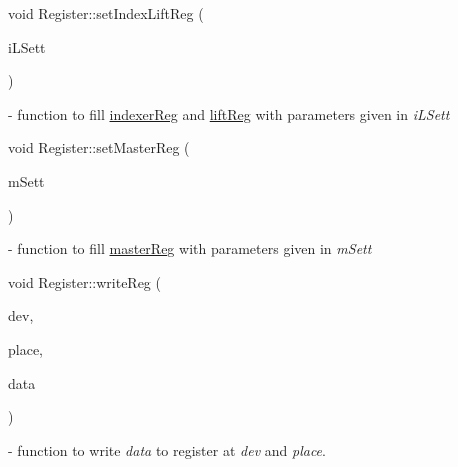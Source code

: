 {\mbox{\label{classRegister_a7c0d35bc6f9c7d944c178a0b6855072e}} 
{\footnotesize\ttfamily void Register\+::\texorpdfstring{set\+Index\+Lift\+Reg}{setIndexLiftReg} (\begin{DoxyParamCaption}\item[{\mbox{\hyperlink{classIndexerLiftSettings}{Indexer\+Lift\+Settings}}}]{i\+L\+Sett }\end{DoxyParamCaption})} - function to fill \hyperlink{classRegister_ae56b5e4f7096735ffadf834c1ba32dff}{indexer\+Reg} and \hyperlink{classRegister_a5287cbe2ef32fdb9cdbcd6e4bdd82647}{lift\+Reg} with parameters given in \textit{i\+L\+Sett}

\mbox{\label{classRegister_a992283907794ce91287b3c4357385aa4}} 
{\footnotesize\ttfamily void Register\+::\texorpdfstring{set\+Master\+Reg}{setMasterReg} (\begin{DoxyParamCaption}\item[{\mbox{\hyperlink{classMachineSettings}{Machine\+Settings}}}]{m\+Sett }\end{DoxyParamCaption})} - function to fill \hyperlink{classRegister_ae778c3bcd7170fe6648df3979082e9f8}{master\+Reg} with parameters given in \mbox{\textit{m\+Sett}}

\mbox{\label{classRegister_a6c51e7d73be200ba0c9b72b1407b6fe2}} 
{\footnotesize\ttfamily void Register\+::\texorpdfstring{write\+Reg}{writeReg} (\begin{DoxyParamCaption}\item[{\mbox{\hyperlink{settings_8h_a48091a1e52849b0871df2f7081be2e38}{uint8\+\_\+t}}}]{dev,  }\item[{\mbox{\hyperlink{settings_8h_a48091a1e52849b0871df2f7081be2e38}{uint8\+\_\+t}}}]{place,  }\item[{\mbox{\hyperlink{settings_8h_a017dd44e68049ffdd31500a8cd01ba68}{uint16\+\_\+t}}}]{data }\end{DoxyParamCaption})} - function to write \textit{data} to  register at \textit{dev} and \textit{place}.



}
